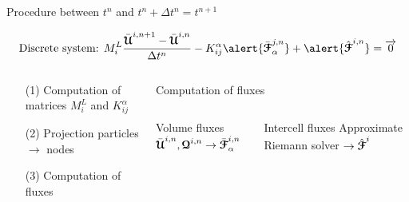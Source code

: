 \begin{frame}{Procedure between $t^n$ and $t^n + \Delta t^n=t^{n+1}$}
  \begin{footnotesize}
    \begin{equation*}
      \text{Discrete system: }M^L_{i} \frac{\bar{\Ucb}^{i,n+1} - \bar{\Ucb}^{i,n}}{\Delta t^n}  - K_{ij}^\alpha \alert{\bar{\Fcb}^{j,n}_{\alpha}}  + \alert{\hat{\Fcb}^{i,n}}=  \vect{0}
    \end{equation*}
    \begin{columns}
      \begin{column}{0.4\textwidth}
        \begin{itemize}
        \item[(1)] Computation of matrices $M_i^L$ and $K_{ij}^\alpha$
        \item[(2)] Projection particles $\rightarrow$ nodes
        \item[(3)] Computation of fluxes
        \end{itemize}
      \end{column}
      \vrule{}
      \begin{column}{0.6\textwidth}
        \begin{block}{Computation of fluxes}
          \begin{columns}
            \begin{column}{0.4\textwidth}
              \begin{block}{\footnotesize Volume fluxes}
                $\bar{{\boldsymbol{\mathcal{U}}}}^{i,n},{\boldsymbol{\mathcal{Q}}}^{i,n} \rightarrow \bar{{\boldsymbol{\mathcal{F}}}}^{i,n}_\alpha$
              \end{block}
            \end{column}
            \begin{column}{0.55\textwidth}
              \begin{block}{\footnotesize Intercell fluxes}
                Approximate Riemann solver $\rightarrow \hat{{\boldsymbol{\mathcal{F}}}}^i$
              \end{block}
            \end{column}
          \end{columns}
        \end{block}
      \end{column}
    \end{columns}
  \end{footnotesize}
\end{frame}

